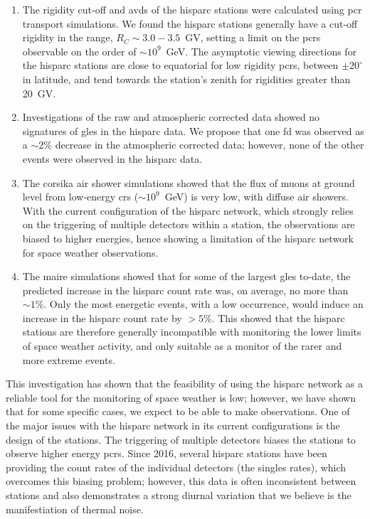 \begin{enumerate}
	\item{The rigidity cut-off and \glspl{avd} of the \gls{hisparc} stations were calculated using \gls{pcr} transport simulations. We found the \gls{hisparc} stations generally have a cut-off rigidity in the range, $R_C \sim 3.0 - 3.5$~GV, setting a limit on the \glspl{pcr} observable on the order of $\sim 10^9$~GeV. The asymptotic viewing directions for the \gls{hisparc} stations are close to equatorial for low rigidity \glspl{pcr}, between $\pm 20^{\circ}$ in latitude, and tend towards the station's zenith for rigidities greater than 20~GV.}
		
	\item{Investigations of the raw and atmospheric corrected data showed no signatures of \glspl{gle} in the \gls{hisparc} data. We propose that one \gls{fd} was observed as a $\sim 2\%$ decrease in the atmospheric corrected data; however, none of the other events were observed in the \gls{hisparc} data.}
	
	\item{The \gls{corsika} air shower simulations showed that the flux of muons at ground level from low-energy \glspl{cr} ($\sim 10^9$~GeV) is very low, with diffuse air showers. With the current configuration of the \gls{hisparc} network, which strongly relies on the triggering of multiple detectors within a station, the observations are biased to higher energies, hence showing a limitation of the \gls{hisparc} network for space weather observations.}

	\item{The \gls{maire} simulations showed that for some of the largest \glspl{gle} to-date, the predicted increase in the \gls{hisparc} count rate was, on average, no more than $\sim 1\%$. Only the most energetic events, with a low occurrence, would induce an increase in the \gls{hisparc} count rate by $>5\%$. This showed that the \gls{hisparc} stations are therefore generally incompatible with monitoring the lower limits of space weather activity, and only suitable as a monitor of the rarer and more extreme events.}

\end{enumerate}

This investigation has shown that the feasibility of using the \gls{hisparc} network as a reliable tool for the monitoring of space weather is low; however, we have shown that for some specific cases, we expect to be able to make observations. One of the major issues with the \gls{hisparc} network in its current configurations is the design of the stations. The triggering of multiple detectors biases the stations to observe higher energy \glspl{pcr}. Since 2016, several \gls{hisparc} stations have been providing the count rates of the individual detectors (the singles rates), which overcomes this biasing problem; however, this data is often inconsistent between stations and also demonstrates a strong diurnal variation that we believe is the manifestiation of thermal noise. 

